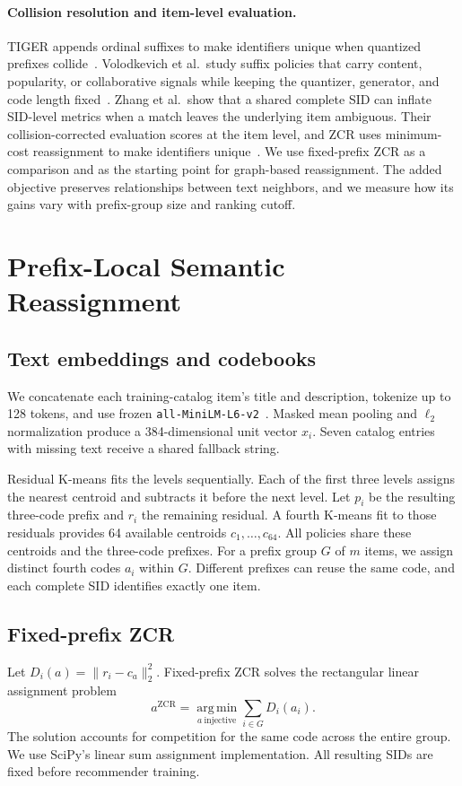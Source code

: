 \documentclass[10pt,twocolumn,letterpaper]{article}
\begin{document}
\paragraph{Collision resolution and item-level evaluation.}
TIGER appends ordinal suffixes to make identifiers unique when quantized prefixes collide~\cite{rajput2023generative}.
Volodkevich et al.\ study suffix policies that carry content, popularity, or collaborative signals while keeping the quantizer, generator, and code length fixed~\cite{volodkevich2026last}.
Zhang et al.\ show that a shared complete SID can inflate SID-level metrics when a match leaves the underlying item ambiguous.
Their collision-corrected evaluation scores at the item level, and ZCR uses minimum-cost reassignment to make identifiers unique~\cite{zhang2026faithful}.
We use fixed-prefix ZCR as a comparison and as the starting point for graph-based reassignment.
The added objective preserves relationships between text neighbors, and we measure how its gains vary with prefix-group size and ranking cutoff.

\section{Prefix-Local Semantic Reassignment}
\label{sec:method}

\subsection{Text embeddings and codebooks}
We concatenate each training-catalog item's title and description, tokenize up to 128 tokens, and use frozen \texttt{all-MiniLM-L6-v2}~\cite{minilm}.
Masked mean pooling and $\ell_2$ normalization produce a 384-dimensional unit vector $x_i$.
Seven catalog entries with missing text receive a shared fallback string.

Residual K-means fits the levels sequentially.
Each of the first three levels assigns the nearest centroid and subtracts it before the next level.
Let $p_i$ be the resulting three-code prefix and $r_i$ the remaining residual.
A fourth K-means fit to those residuals provides 64 available centroids $c_1,\dots,c_{64}$.
All policies share these centroids and the three-code prefixes.
For a prefix group $G$ of $m$ items, we assign distinct fourth codes $a_i$ within $G$.
Different prefixes can reuse the same code, and each complete SID identifies exactly one item.

\subsection{Fixed-prefix ZCR}
\label{sec:zcr}
Let $D_i(a)=\|r_i-c_a\|_2^2$.
Fixed-prefix ZCR solves the rectangular linear assignment problem
\begin{equation}
    a^{\mathrm{ZCR}} =
        \operatorname*{arg\,min}_{a\ \mathrm{injective}}
        \sum_{i\in G} D_i(a_i).
    \label{eq:zcr}
\end{equation}
The solution accounts for competition for the same code across the entire group.
We use SciPy's linear sum assignment implementation.
All resulting SIDs are fixed before recommender training.
\end{document}
